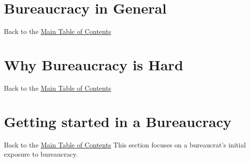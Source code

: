 \documentclass{book}
\begin{document}
   \clearpage
   \clearpage
    \clearpage
  
      \clearpage%
      \clearpage
      \clearpage%
     \clearpage
     \clearpage
     \clearpage
      \clearpage%
  \clearpage
  \clearpage 

\chapter{Bureaucracy in General\label{sec:bureaucracy-in-general}}
{\footnotesize Back to the \hyperref[sec:toc]{Main Table of Contents}}
\minitoc
   \clearpage
   \clearpage
   \clearpage
   \clearpage
   \clearpage 
   \clearpage
   \clearpage
   \clearpage
   \clearpage
   \clearpage

\chapter{Why Bureaucracy is Hard\label{sec:why-bur-hard}}
  {\footnotesize Back to the \hyperref[sec:toc]{Main Table of Contents}}
  \minitoc
   \clearpage
   \clearpage
   \clearpage

\chapter{Getting started in a Bureaucracy\label{sec:getting-started}}
  {\footnotesize Back to the \hyperref[sec:toc]{Main Table of Contents}}
  \minitoc
    This section focuses on a bureaucrat's initial exposure to bureaucracy. 
  
\end{document}

